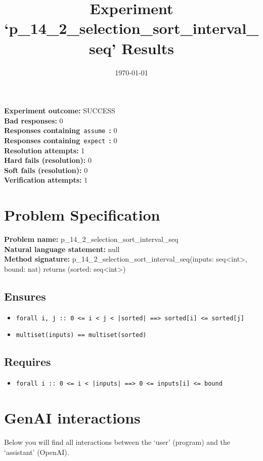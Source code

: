 \documentclass{article}
\begin{document}
\title{Experiment `p\_14\_2\_selection\_sort\_interval\_seq' Results}
\author{\today}
\date{}
\maketitle
\textbf{Experiment outcome: }SUCCESS
\\\textbf{Bad responses: }0
\\\textbf{Responses containing}~\texttt{assume}~\textbf{: }0
\\\textbf{Responses containing}~\texttt{expect}~\textbf{: }0
\\\textbf{Resolution attempts: }1
\\\textbf{Hard fails (resolution): }0
\\\textbf{Soft fails (resolution): }0
\\\textbf{Verification attempts: }1
\section*{Problem Specification}
\textbf{Problem name: }p\_14\_2\_selection\_sort\_interval\_seq
\\\textbf{Natural language statement: }null
\\\textbf{Method signature: }p\_14\_2\_selection\_sort\_interval\_seq(inputs: seq<int>, bound: nat) returns (sorted: seq<int>)
\subsection*{Ensures}
\begin{itemize}
\item \texttt{forall i, j :: 0 <= i < j < |sorted| ==> sorted[i] <= sorted[j]}
\item \texttt{multiset(inputs) == multiset(sorted)}
\end{itemize}
\subsection*{Requires}
\begin{itemize}
\item \texttt{forall i :: 0 <= i < |inputs| ==> 0 <= inputs[i] <= bound}
\end{itemize}
\clearpage
\section*{GenAI interactions}
Below you will find all interactions between the `user' (program) and the `assistant' (OpenAI).
\end{document}
